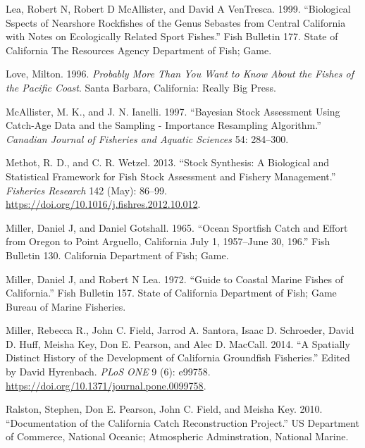 \documentclass[11pt,
  english,
  a4paper,
]{article}
\begin{document}
\begin{cslreferences}
\leavevmode\hypertarget{ref-lea_biological_1999}{}%
Lea, Robert N, Robert D McAllister, and David A VenTresca. 1999. ``Biological Sspects of Nearshore Rockfishes of the Genus Sebastes from Central California with Notes on Ecologically Related Sport Fishes.'' Fish Bulletin 177. State of California The Resources Agency Department of Fish; Game.

\leavevmode\hypertarget{ref-love_milton_probably_1996}{}%
Love, Milton. 1996. \emph{Probably More Than You Want to Know About the Fishes of the Pacific Coast}. Santa Barbara, California: Really Big Press.

\leavevmode\hypertarget{ref-mcallister_bayesian_1997}{}%
McAllister, M. K., and J. N. Ianelli. 1997. ``Bayesian Stock Assessment Using Catch-Age Data and the Sampling - Importance Resampling Algorithm.'' \emph{Canadian Journal of Fisheries and Aquatic Sciences} 54: 284--300.

\leavevmode\hypertarget{ref-methot_stock_2013}{}%
Methot, R. D., and C. R. Wetzel. 2013. ``Stock Synthesis: A Biological and Statistical Framework for Fish Stock Assessment and Fishery Management.'' \emph{Fisheries Research} 142 (May): 86--99. \url{https://doi.org/10.1016/j.fishres.2012.10.012}.

\leavevmode\hypertarget{ref-miller_ocean_1965}{}%
Miller, Daniel J, and Daniel Gotshall. 1965. ``Ocean Sportfish Catch and Effort from Oregon to Point Arguello, California July 1, 1957--June 30, 196.'' Fish Bulletin 130. California Department of Fish; Game.

\leavevmode\hypertarget{ref-miller_guide_1972}{}%
Miller, Daniel J, and Robert N Lea. 1972. ``Guide to Coastal Marine Fishes of California.'' Fish Bulletin 157. State of California Department of Fish; Game Bureau of Marine Fisheries.

\leavevmode\hypertarget{ref-miller_spatially_2014}{}%
Miller, Rebecca R., John C. Field, Jarrod A. Santora, Isaac D. Schroeder, David D. Huff, Meisha Key, Don E. Pearson, and Alec D. MacCall. 2014. ``A Spatially Distinct History of the Development of California Groundfish Fisheries.'' Edited by David Hyrenbach. \emph{PLoS ONE} 9 (6): e99758. \url{https://doi.org/10.1371/journal.pone.0099758}.

\leavevmode\hypertarget{ref-ralston_documentation_2010}{}%
Ralston, Stephen, Don E. Pearson, John C. Field, and Meisha Key. 2010. ``Documentation of the California Catch Reconstruction Project.'' US Department of Commerce, National Oceanic; Atmospheric Adminstration, National Marine.


\end{cslreferences}
\end{document}
